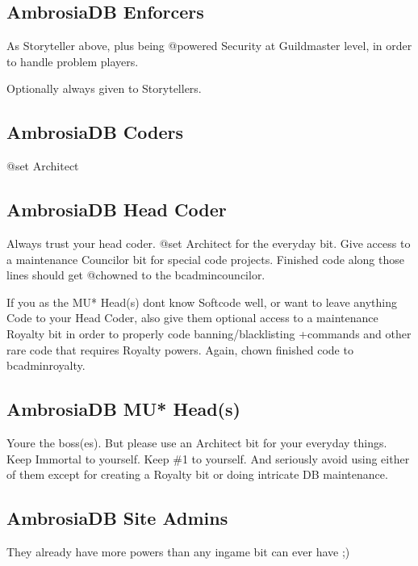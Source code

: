 \documentclass[letterpaper,10pt,english]{sphinxmanual}
\begin{document}
\subsection{AmbrosiaDB Enforcers}
\label{\detokenize{ambrosiadb:ambrosiadb-enforcers}}
\sphinxAtStartPar
As Storyteller above, plus being @powered Security at
Guildmaster level, in order to handle problem players.

\sphinxAtStartPar
Optionally always given to Storytellers.


\subsection{AmbrosiaDB Coders}
\label{\detokenize{ambrosiadb:ambrosiadb-coders}}
\sphinxAtStartPar
@set Architect


\subsection{AmbrosiaDB Head Coder}
\label{\detokenize{ambrosiadb:ambrosiadb-head-coder}}
\sphinxAtStartPar
Always trust your head coder.
@set Architect for the everyday bit. Give access to a
maintenance Councilor bit for special code projects. Finished
code along those lines should get @chowned to the
bc\sphinxhyphen{}admin\sphinxhyphen{}councilor.

\sphinxAtStartPar
If you as the MU* Head(s) don\textquotesingle{}t know Softcode well, or want to
leave anything Code to your Head Coder, also give them optional
access to a maintenance Royalty bit in order to properly code
banning/blacklisting +commands and other rare code that requires
Royalty powers. Again, chown finished code to bc\sphinxhyphen{}admin\sphinxhyphen{}royalty.


\subsection{AmbrosiaDB MU* Head(s)}
\label{\detokenize{ambrosiadb:ambrosiadb-mu-head-s}}
\sphinxAtStartPar
You\textquotesingle{}re the boss(es). But please use an Architect bit for your
everyday things. Keep Immortal to yourself. Keep \#1 to yourself.
And seriously avoid using either of them except for creating
a Royalty bit or doing intricate DB maintenance.


\subsection{AmbrosiaDB Site Admins}
\label{\detokenize{ambrosiadb:ambrosiadb-site-admins}}
\sphinxAtStartPar
They already have more powers than any in\sphinxhyphen{}game bit can ever
have ;)
\end{document}
